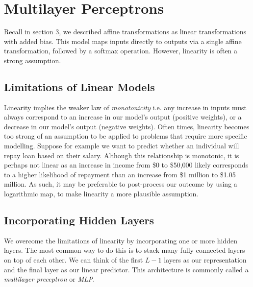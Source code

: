 \documentclass[a4paper,12pt]{article}
\theoremstyle{definition}
\begin{document}
\section{Multilayer Perceptrons}
Recall in section 3, we described affine transformations as linear transformations with added bias. This model maps inputs directly to
outputs via a single affine transformation, followed by a softmax operation. However, linearity is often a strong assumption.
\subsection*{Limitations of Linear Models}
Linearity implies the weaker law of \textit{monotonicity} i.e. any increase in inputs must always correspond to an increase in our model's
output (positive weights), or a decrease in our model's output (negative weights). Often times, linearity becomes too strong of an assumption
to be applied to problems that require more specific modelling. Suppose for example we want to predict whether an individual will repay loan
based on their salary. Although this relationship is monotonic, it is perhaps not linear as an increase in income from \$0 to \$50,000 likely
corresponds to a higher likelihood of repayment than an increase from \$1 million to \$1.05 million. As such, it may be preferable to
post-process our outcome by using a logarithmic map, to make linearity a more plausible assumption.
\subsection*{Incorporating Hidden Layers}
We overcome the limitations of linearity by incorporating one or more hidden layers. The most common way to do this is to stack many fully
connected layers on top of each other. We can think of the first $L-1$ layers as our representation and the final layer as our linear predictor.
This architecture is commonly called a \textit{multilayer preceptron} or \textit{MLP}.
\end{document}
